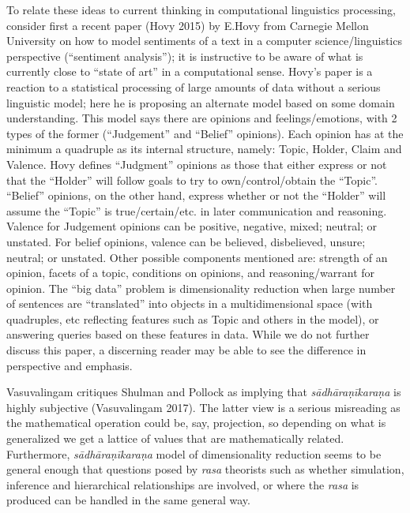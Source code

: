 \newpage

To relate these ideas to current thinking in computational linguistics processing, consider first a recent paper (Hovy 2015) by E.Hovy from Carnegie Mellon University on how to model sentiments of a text in a computer science/linguistics perspective (“sentiment analysis”); it is instructive to be aware of what is currently close to “state of art” in a computational sense. Hovy’s paper is a reaction to a statistical processing of large amounts of data without a serious linguistic model; here he is proposing an alternate model based on some domain understanding. This model says there are opinions and feelings/emotions, with 2 types of the former (“Judgement” and “Belief” opinions). Each opinion has at the minimum a quadruple as its internal structure, namely: Topic, Holder, Claim and Valence. Hovy defines “Judgment” opinions as those that either express or not that the “Holder” will follow goals to try to own/control/obtain the “Topic”. “Belief” opinions, on the other hand, express whether or not the “Holder” will assume the “Topic” is true/certain/etc. in later communication and reasoning. Valence for Judgement opinions can be positive, negative, mixed; neutral; or unstated. For belief opinions, valence can be believed, disbelieved, unsure; neutral; or unstated. Other possible components mentioned are: strength of an opinion, facets of a topic, conditions on opinions, and reasoning/warrant for opinion. The “big data” problem is dimensionality reduction when large number of sentences are “translated” into objects in a multidimensional space (with quadruples, etc reflecting features such as Topic and others in the model), or answering queries based on these features in data. While we do not further discuss this paper, a discerning reader may be able to see the difference in perspective and emphasis.

Vasuvalingam critiques Shulman and Pollock as implying that \textsl{sādhāraṇīkaraṇa} is highly subjective (Vasuvalingam 2017). The latter view is a serious misreading as the mathematical operation could be, say, projection, so depending on what is generalized we get a lattice of values that are mathematically related. Furthermore, \textsl{sādhāraṇīkaraṇa} model of dimensionality reduction seems to be general enough that questions posed by \textsl{rasa} theorists such as whether simulation, inference and hierarchical relationships are involved, or where the \textsl{rasa} is produced can be handled in the same general way.

